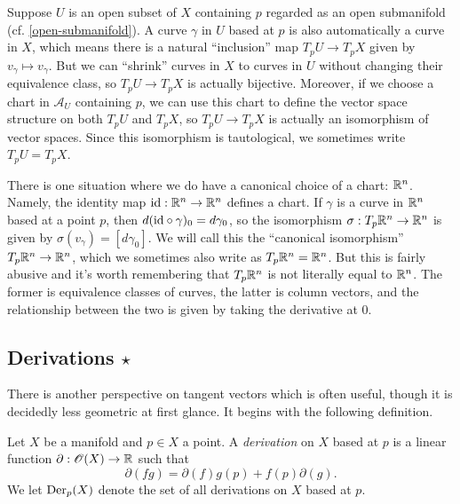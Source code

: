\begin{remark} \label{tangent-open}
	Suppose $U$ is an open subset of $X$ containing $p$ regarded as an open submanifold (cf. \cref{open-submanifold}). A curve $\gamma$ in $U$ based at $p$ is also automatically a curve in $X$, which means there is a natural ``inclusion'' map $T_p U \to T_p X$ given by $v_\gamma \mapsto v_\gamma$. But we can ``shrink'' curves in $X$ to curves in $U$ without changing their equivalence class, so $T_p U \to T_p X$ is actually bijective. Moreover, if we choose a chart in $\mathscr{A}_U$ containing $p$, we can use this chart to define the vector space structure on both $T_p U$ and $T_p X$, so $T_p U \to T_p X$ is actually an isomorphism of vector spaces. Since this isomorphism is tautological, we sometimes write $T_p U = T_p X$. 
\end{remark}

\begin{remark} \label{tangent-euclidean}
	There is one situation where we do have a canonical choice of a chart: $\mathbb{R}^n$. Namely, the identity map $\mathrm{id} : \mathbb{R}^n \to \mathbb{R}^n$ defines a chart. If $\gamma$ is a curve in $\mathbb{R}^n$ based at a point $p$, then $d(\mathrm{id} \circ \gamma)_0 = d\gamma_0$, so the isomorphism $\sigma : T_p \mathbb{R}^n \to \mathbb{R}^n$ is given by $\sigma(v_\gamma) = [d\gamma_0]$. We will call this the ``canonical isomorphism'' $T_p \mathbb{R}^n \to \mathbb{R}^n$, which we sometimes also write as $T_p \mathbb{R}^n = \mathbb{R}^n$. But this is fairly abusive and it's worth remembering that $T_p \mathbb{R}^n$ is not literally equal to $\mathbb{R}^n$. The former is equivalence classes of curves, the latter is column vectors, and the relationship between the two is given by taking the derivative at 0. 
\end{remark}

\subsection{Derivations \texorpdfstring{$\star$}{*}}

There is another perspective on tangent vectors which is often useful, though it is decidedly less geometric at first glance. It begins with the following definition.  

\begin{definition} 
	Let $X$ be a manifold and $p \in X$ a point. A \emph{derivation} on $X$ based at $p$ is a linear function $\partial : \mathscr{O}(X) \to \mathbb{R}$ such that
	\[ \partial(fg) = \partial(f)g(p) + f(p)\partial(g). \]
	We let $\operatorname{Der}_p(X)$ denote the set of all derivations on $X$ based at $p$. 
\end{definition}

